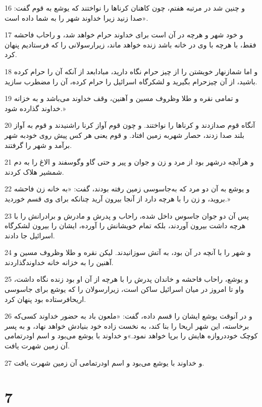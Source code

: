 \par 16 و چنین شد در مرتبه هفتم، چون کاهنان کرناها را نواختند که یوشع به قوم گفت: «صدا زنید زیرا خداوند شهر را به شما داده است.
\par 17 و خود شهر و هر‌چه در آن است برای خداوند حرام خواهد شد، و راحاب فاحشه فقط، با هر‌چه با وی در خانه باشد زنده خواهد ماند، زیرارسولانی را که فرستادیم پنهان کرد.
\par 18 و اما شمازنهار خویشتن را از چیز حرام نگاه دارید، مبادابعد از آنکه آن را حرام کرده باشید، از آن چیزحرام بگیرید و لشکرگاه اسرائیل را حرام کرده، آن را مضطرب سازید.
\par 19 و تمامی نقره و طلا وظروف مسین و آهنین، وقف خداوند می‌باشد و به خزانه خداوند گذارده شود.»
\par 20 آنگاه قوم صدازدند و کرناها را نواختند. و چون قوم آواز کرنا راشنیدند و قوم به آواز بلند صدا زدند، حصار شهربه زمین افتاد. و قوم یعنی هر کس پیش روی خودبه شهر برآمد و شهر را گرفتند.
\par 21 و هر‌آنچه درشهر بود از مرد و زن و جوان و پیر و حتی گاو وگوسفند و الاغ را به دم شمشیر هلاک کردند.
\par 22 و یوشع به آن دو مرد که به‌جاسوسی زمین رفته بودند، گفت: «به خانه زن فاحشه بروید، و زن را با هر‌چه دارد از آنجا بیرون آرید چنانکه برای وی قسم خوردید.»
\par 23 پس آن دو جوان جاسوس داخل شده، راحاب و پدرش و مادرش و برادرانش را با هر‌چه داشت بیرون آوردند، بلکه تمام خویشانش را آورده، ایشان را بیرون لشکرگاه اسرائیل جا دادند.
\par 24 و شهر را با آنچه در آن بود، به آتش سوزانیدند. لیکن نقره و طلا وظروف مسین و آهنین را به خزانه خانه خداوندگذاردند.
\par 25 و یوشع، راحاب فاحشه و خاندان پدرش را با هر‌چه از آن او بود زنده نگاه داشت، واو تا امروز در میان اسرائیل ساکن است، زیرارسولان را که یوشع برای جاسوسی اریحافرستاده بود پنهان کرد.
\par 26 و در آنوقت یوشع ایشان را قسم داده، گفت: «ملعون باد به حضور خداوند کسی‌که برخاسته، این شهر اریحا را بنا کند، به نخست زاده خود بنیادش خواهد نهاد، و به پسر کوچک خوددروازه هایش را برپا خواهد نمود.»و خداوند با یوشع می‌بود و اسم اودرتمامی آن زمین شهرت یافت.
\par 27 و خداوند با یوشع می‌بود و اسم اودرتمامی آن زمین شهرت یافت.
 
\chapter{7}

